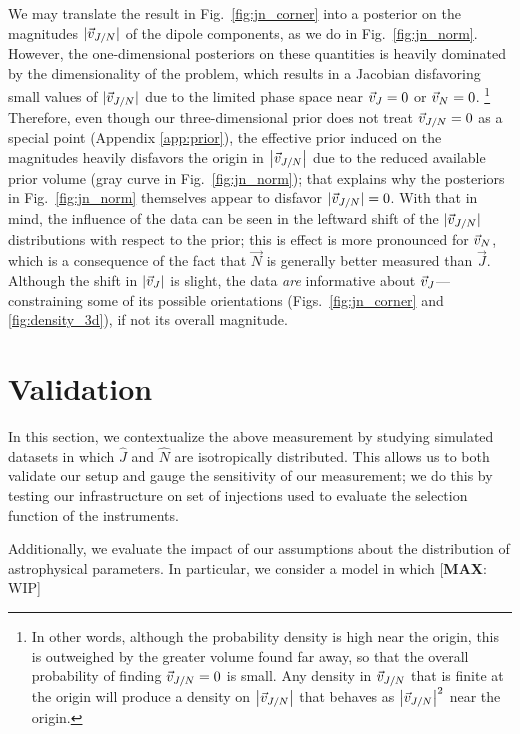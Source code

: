 \documentclass[aps,prd,twocolumn,superscriptaddress,preprintnumbers,floatfix,nofootinbib]{revtex4-2}
\newcommand*{\mi}[1]{{\color{magenta} [{\bf MAX}: #1]}}
\begin{document}
We may translate the result in Fig.~\ref{fig:jn_corner} into a posterior on the magnitudes $|\vec{v}_{J/N}|$ of the dipole components, as we do in Fig.~\ref{fig:jn_norm}.
However, the one-dimensional posteriors on these quantities is heavily dominated by the dimensionality of the problem, which results in a Jacobian disfavoring small values of $|\vec{v}_{J/N}|$ due to the limited phase space near $\vec{v}_{J}=0$ or $\vec{v}_{N} = 0$.%
\footnote{In other words, although the probability density is high near the origin, this is outweighed by the greater volume found far away, so that the overall probability of finding $\vec{v}_{J/N}=0$ is small.  Any density in $\vec{v}_{J/N}$ that is finite at the origin will produce a density on $\left| \vec{v}_{J/N} \right|$ that behaves as $\left| \vec{v}_{J/N} \right|^2$ near the origin.}
Therefore, even though our three-dimensional prior does not treat $\vec{v}_{J/N} = 0$ as a special point (Appendix \ref{app:prior}), the effective prior induced on the magnitudes heavily disfavors the origin in $\left| \vec{v}_{J/N} \right|$ due to the reduced available prior volume (gray curve in Fig.~\ref{fig:jn_norm}); that explains why the posteriors in Fig.~\ref{fig:jn_norm} themselves appear to disfavor $|\vec{v}_{J/N}| = 0$.
With that in mind, the influence of the data can be seen in the leftward shift of the $|\vec{v}_{J/N}|$ distributions with respect to the prior; this is effect is more pronounced for $\vec{v}_{N}$, which is a consequence of the fact that $\vec{N}$ is generally better measured than $\vec{J}$.
Although the shift in $|\vec{v}_{J}|$ is slight, the data \emph{are} informative about $\vec{v}_{J}$---constraining some of its possible orientations (Figs.~\ref{fig:jn_corner} and \ref{fig:density_3d}), if not its overall magnitude.

\section{Validation}
\label{sec:validation}

In this section, we contextualize the above measurement by studying simulated datasets in which $\hat{J}$ and $\hat{N}$ are isotropically distributed.
This allows us to both validate our setup and gauge the sensitivity of our measurement; we do this by testing our infrastructure on set of injections used to evaluate the selection function of the instruments.

Additionally, we evaluate the impact of our assumptions about the distribution of astrophysical parameters. 
In particular, we consider a model in which  \mi{WIP}
\end{document}
